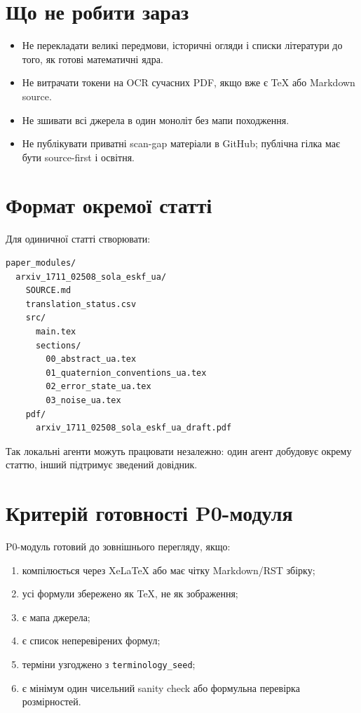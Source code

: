 \section{Що не робити зараз}

\begin{itemize}
\item Не перекладати великі передмови, історичні огляди і списки літератури до того, як готові математичні ядра.
\item Не витрачати токени на OCR сучасних PDF, якщо вже є TeX або Markdown source.
\item Не зшивати всі джерела в один моноліт без мапи походження.
\item Не публікувати приватні scan-gap матеріали в GitHub; публічна гілка має бути source-first і освітня.
\end{itemize}

\section{Формат окремої статті}

Для одиничної статті створювати:

\begin{lstlisting}
paper_modules/
  arxiv_1711_02508_sola_eskf_ua/
    SOURCE.md
    translation_status.csv
    src/
      main.tex
      sections/
        00_abstract_ua.tex
        01_quaternion_conventions_ua.tex
        02_error_state_ua.tex
        03_noise_ua.tex
    pdf/
      arxiv_1711_02508_sola_eskf_ua_draft.pdf
\end{lstlisting}

Так локальні агенти можуть працювати незалежно: один агент добудовує окрему статтю, інший підтримує зведений довідник.

\section{Критерій готовності P0-модуля}

P0-модуль готовий до зовнішнього перегляду, якщо:

\begin{enumerate}
\item компілюється через XeLaTeX або має чітку Markdown/RST збірку;
\item усі формули збережено як TeX, не як зображення;
\item є мапа джерела;
\item є список неперевірених формул;
\item терміни узгоджено з \texttt{terminology\_seed};
\item є мінімум один чисельний sanity check або формульна перевірка розмірностей.
\end{enumerate}
